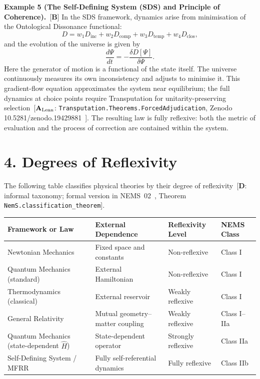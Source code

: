 \documentclass[11pt]{article}
\newcommand{\CatAL}{\ensuremath{\textbf{A}_{\rm Lean}}}
\newcommand{\CatB}{\textbf{B}}
\newcommand{\CatD}{\textbf{D}}
\begin{document}
\vspace{0.3cm}

\textbf{Example 5 (The Self-Defining System (SDS) and Principle of Coherence).}~[$\CatB$]
In the SDS framework, dynamics arise from
minimisation of the Ontological Dissonance functional:
\[
D = w_1 D_{\text{inc}} + w_2 D_{\text{comp}} + w_3 D_{\text{temp}}
    + w_4 D_{\text{clos}},
\]
and the evolution of the universe is given by
\[
\frac{d\Psi}{dt} = -\frac{\delta D[\Psi]}{\delta \Psi}.
\]
Here the generator of motion is a functional of the state itself.
The universe continuously measures its own inconsistency and adjusts to
minimise it.
This gradient-flow equation approximates the system near equilibrium;
the full dynamics at choice points require Transputation for
unitarity-preserving selection~[$\CatAL$: \texttt{Transputation.Theorems.\allowbreak ForcedAdjudication},
Zenodo 10.5281/zenodo.19429881~\cite{SpivackNEMS76}].
The resulting law is fully reflexive: both the metric of evaluation and
the process of correction are contained within the system.

\section*{4. Degrees of Reflexivity}

The following table classifies physical theories by their degree of
reflexivity~[$\CatD$: informal taxonomy; formal version in
NEMS~02~\cite{SpivackNEMSTheorem}, Theorem \texttt{NemS.classification\_theorem}].

\begin{center}
{\small
\begin{tabular}{p{3.8cm} p{3.8cm} p{2.5cm} l}
\toprule
\textbf{Framework or Law} & \textbf{External Dependence} & \textbf{Reflexivity Level} & \textbf{NEMS Class} \\
\midrule
Newtonian Mechanics & Fixed space and constants & Non-reflexive & Class I \\
Quantum Mechanics (standard) & External Hamiltonian & Non-reflexive & Class I \\
Thermodynamics (classical) & External reservoir & Weakly reflexive & Class I \\
General Relativity & Mutual geometry--matter coupling & Weakly reflexive & Class I--IIa \\
Quantum Mechanics (state-dependent $\hat{H}$) & State-dependent operator & Strongly reflexive & Class IIa \\
Self-Defining System / MFRR & Fully self-referential dynamics & Fully reflexive & Class IIb \\
\bottomrule
\end{tabular}
}
\end{center}
\end{document}
